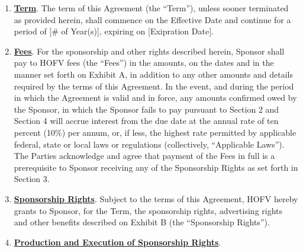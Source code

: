 \documentclass[]{article}
\begin{document}
\begin{enumerate}
\def\labelenumi{\arabic{enumi}.}
\item
  \textbf{\uline{Term}}. The term of this Agreement (the ``Term''),
  unless sooner terminated as provided herein, shall commence on the
  Effective Date and continue for a period of {[}\# of Year(s){]},
  expiring on {[}Exipration Date{]}.
\item
  \textbf{\uline{Fees}}. For the sponsorship and other rights described
  herein, Sponsor shall pay to HOFV fees (the ``Fees'') in the amounts,
  on the dates and in the manner set forth on Exhibit A, in addition to
  any other amounts and details required by the terms of this Agreement.
  In the event, and during the period in which the Agreement is valid
  and in force, any amounts confirmed owed by the Sponsor, in which the
  Sponsor fails to pay pursuant to Section 2 and Section 4 will accrue
  interest from the due date at the annual rate of ten percent (10\%)
  per annum, or, if less, the highest rate permitted by applicable
  federal, state or local laws or regulations (collectively,
  ``Applicable Laws''). The Parties acknowledge and agree that payment
  of the Fees in full is a prerequisite to Sponsor receiving any of the
  Sponsorship Rights as set forth in Section 3.
\item
  \textbf{\uline{Sponsorship Rights}}. Subject to the terms of this
  Agreement, HOFV hereby grants to Sponsor, for the Term, the
  sponsorship rights, advertising rights and other benefits described on
  Exhibit B (the ``Sponsorship Rights'').
\item
  \textbf{\uline{Production and Execution of Sponsorship Rights}}.


\end{enumerate}
\end{document}
